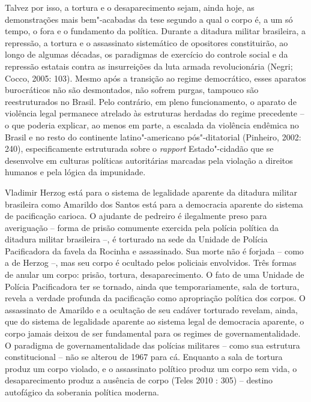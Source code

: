 Talvez por isso, a tortura e o desaparecimento sejam, ainda hoje, as
demonstrações mais bem"-acabadas da tese segundo a qual o corpo é, a um
só tempo, o fora e o fundamento da política. Durante a ditadura militar
brasileira, a repressão, a tortura e o assassinato sistemático de
opositores constituirão, ao longo de algumas décadas, os paradigmas de
exercício do controle social e da repressão estatais contra as
insurreições da luta armada revolucionária (Negri; Cocco, 2005: 103).
Mesmo após a transição ao regime democrático, esses aparatos
burocráticos não são desmontados, não sofrem purgas, tampouco são
reestruturados no Brasil. Pelo contrário, em pleno funcionamento, o
aparato de violência legal permanece atrelado às estruturas herdadas do
regime precedente -- o que poderia explicar, ao menos em parte, a
escalada da violência endêmica no Brasil e no resto do continente
latino"-americano pós"-ditatorial (Pinheiro, 2002: 240), especificamente
estruturada sobre o \emph{rapport }Estado"-cidadão que se desenvolve em
culturas políticas autoritárias marcadas pela violação a direitos
humanos e pela lógica da impunidade.

Vladimir Herzog está para o sistema de legalidade aparente da ditadura
militar brasileira como Amarildo dos Santos está para a democracia
aparente do sistema de pacificação carioca. O ajudante de pedreiro é
ilegalmente preso para averiguação -- forma de prisão comumente exercida
pela polícia política da ditadura militar brasileira --, é torturado na
sede da Unidade de Polícia Pacificadora da favela da Rocinha e
assassinado. Sua morte não é forjada -- como a de Herzog --, mas seu
corpo é ocultado pelos policiais envolvidos. Três formas de anular um
corpo: prisão, tortura, desaparecimento. O fato de uma Unidade de
Polícia Pacificadora ter se tornado, ainda que temporariamente, sala de
tortura, revela a verdade profunda da pacificação como apropriação
política dos corpos. O assassinato de Amarildo e a ocultação de seu
cadáver torturado revelam, ainda, que do sistema de legalidade aparente
ao sistema legal de democracia aparente, o corpo jamais deixou de ser
fundamental para os regimes de governamentalidade. O paradigma de
governamentalidade das polícias militares -- como sua estrutura
constitucional -- não se alterou de 1967 para cá. Enquanto a sala de
tortura produz um corpo violado, e o assassinato político produz um
corpo sem vida, o desaparecimento produz a ausência de corpo (Teles 2010
: 305) -- destino autofágico da soberania política moderna.

